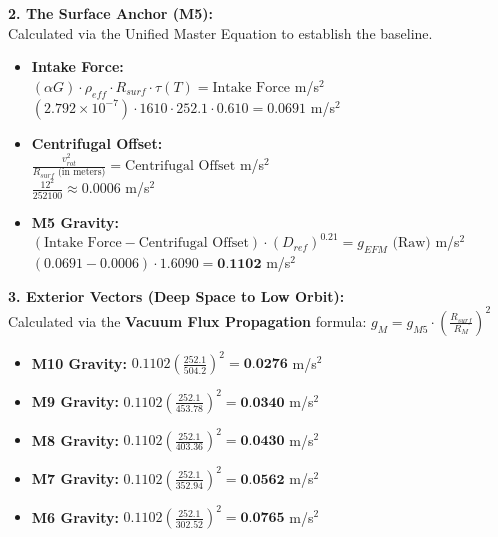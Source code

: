 \documentclass[11pt, a4paper]{article}
\begin{document}
  \vspace{1.0em}
  \noindent \textbf{2. The Surface Anchor (M5):} \\
  \hspace*{1em} Calculated via the Unified Master Equation to establish the baseline.
  \begin{itemize}
    \item \textbf{Intake Force:} \\[0.5em]
    \hspace*{2em} $(\alpha G) \cdot \rho_{eff} \cdot R_{surf} \cdot \tau(T) = \text{Intake Force}$ m/s$^2$ \\[1em]
    \hspace*{2em} $(2.792 \times 10^{-7}) \cdot 1610 \cdot 252.1 \cdot 0.610 = 0.0691$ m/s$^2$
    
    \item \textbf{Centrifugal Offset:} \\[0.5em]
    \hspace*{2em} $\frac{v_{rot}^2}{R_{surf} \text{ (in meters)}} = \text{Centrifugal Offset}$ m/s$^2$ \\[1em]
    \hspace*{2em} $\frac{12^2}{252100} \approx 0.0006$ m/s$^2$
    
    \item \textbf{M5 Gravity:} \\[0.5em]
    \hspace*{2em} $(\text{Intake Force} - \text{Centrifugal Offset}) \cdot (D_{ref})^{0.21} = g_{EFM} \text{ (Raw)}$ m/s$^2$ \\[1em]
    \hspace*{2em} $(0.0691 - 0.0006) \cdot 1.6090 = \textbf{0.1102}$ m/s$^2$
  \end{itemize}

  \clearpage
  \noindent \textbf{3. Exterior Vectors (Deep Space to Low Orbit):} \\
  \hspace*{1em} Calculated via the \textbf{Vacuum Flux Propagation} formula: $g_M = g_{M5} \cdot \left( \frac{R_{surf}}{R_M} \right)^2$
  \begin{itemize}
    \item \textbf{M10 Gravity:} $0.1102 \left( \frac{252.1}{504.2} \right)^2 = \textbf{0.0276}$ m/s$^2$
    \item \textbf{M9 Gravity:} $0.1102 \left( \frac{252.1}{453.78} \right)^2 = \textbf{0.0340}$ m/s$^2$
    \item \textbf{M8 Gravity:} $0.1102 \left( \frac{252.1}{403.36} \right)^2 = \textbf{0.0430}$ m/s$^2$
    \item \textbf{M7 Gravity:} $0.1102 \left( \frac{252.1}{352.94} \right)^2 = \textbf{0.0562}$ m/s$^2$
    \item \textbf{M6 Gravity:} $0.1102 \left( \frac{252.1}{302.52} \right)^2 = \textbf{0.0765}$ m/s$^2$
  \end{itemize}
\end{document}

